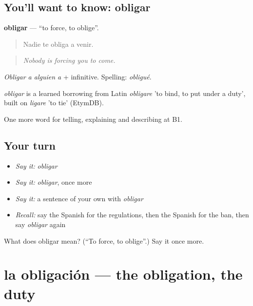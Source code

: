 \subsection*{You'll want to know: obligar}
\textbf{obligar} — \textquotedblleft{}to force, to oblige\textquotedblright{}.

\begin{quote}
Nadie te obliga a venir.
\end{quote}

\begin{quote}
\emph{Nobody is forcing you to come.}
\end{quote}

\emph{Obligar a alguien a} + infinitive. Spelling: \emph{obligué}.

\begin{cousinweb}
\emph{obligar} is a learned borrowing from Latin \emph{obligare} 'to bind, to put under a duty', built on \emph{ligare} 'to tie' (EtymDB).
\end{cousinweb}

\begin{grammarlens}[title={What you've built}]
One more word for telling, explaining and describing at B1.
\end{grammarlens}

\subsection*{Your turn}
\begin{itemize}
\raggedright
  \item \emph{Say it:} \emph{obligar}
  \item \emph{Say it:} \emph{obligar}, once more
  \item \emph{Say it:} a sentence of your own with \emph{obligar}
  \item \emph{Recall:} say the Spanish for the regulations, then the Spanish for the ban, then say \emph{obligar} again
\end{itemize}

\begin{tcolorbox}[breakable,colback=teal!4,colframe=teal!35!black,title={Before you move on}]
What does obligar mean? (\textquotedblleft{}To force, to oblige\textquotedblright{}.) Say it once more.
\end{tcolorbox}
\section[la obligación]{la obligación — the obligation, the duty}

